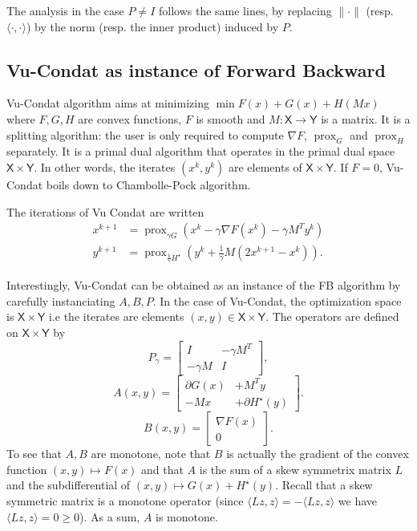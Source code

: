 \documentclass{article}
\DeclareMathOperator{\prox}{prox}
\newcommand{\sX}{{\mathsf X}}
\newcommand{\sY}{{\mathsf Y}}
\newcommand{\ps}[1]{\langle #1 \rangle}
\theoremstyle{definition}
\begin{document}
The analysis in the case $P \neq I$ follows the same lines, by replacing $\|\cdot\|$ (resp. $\ps{\cdot,\cdot}$) by the norm (resp. the inner product) induced by $P$. 




\subsection{Vu-Condat as instance of Forward Backward}

Vu-Condat algorithm aims at minimizing $\min F(x) + G(x) + H(Mx)$ where $F,G,H$ are convex functions, $F$ is smooth and $M : \sX \to \sY$ is a matrix. It is a splitting algorithm: the user is only required to compute $\nabla F$, $\prox_G$ and $\prox_H$ separately. It is a primal dual algorithm that operates in the primal dual space $\sX \times \sY$. In other words, the iterates $(x^k,y^k)$ are elements of $\sX \times \sY$. If $F=0$, Vu-Condat boils down to Chambolle-Pock algorithm.

The iterations of Vu Condat are written
\begin{align}
    x^{k+1}   &= \prox_{\gamma G}(x^k - \gamma \nabla F(x^k) - \gamma M^T y^k)\\
    y^{k+1} &= \prox_{\frac{1}{\gamma} H^\star}(y^k + \frac{1}{\gamma}M(2x^{k+1}-x^k)).
\end{align}

Interestingly, Vu-Condat can be obtained as an instance of the FB algorithm by carefully instanciating $A,B,P$. In the case of Vu-Condat, the optimization space is $\sX \times \sY$ i.e the iterates are elements $(x,y) \in \sX \times \sY$. The operators are defined on $\sX \times \sY$ by
\[
P_\gamma = \begin{bmatrix} I &  -\gamma M^T \\ -\gamma M & I \end{bmatrix},
\]
\[
A(x,y) = \begin{bmatrix} \partial G(x)&  + M^T y \\ -M x& +\partial H^\star(y)\end{bmatrix} .
\]
\[
B(x,y) = \begin{bmatrix} \nabla F(x) \\ 0 \end{bmatrix} .
\]
To see that $A,B$ are monotone, note that $B$ is actually the gradient of the convex function $(x,y) \mapsto F(x)$ and that $A$ is the sum of a skew symmetrix matrix $L$ and the subdifferential of $(x,y) \mapsto G(x) + H^\star(y)$. Recall that a skew symmetric matrix is a monotone operator (since $\ps{Lz,z} = -\ps{Lz,z}$ we have $\ps{Lz,z} = 0 \geq 0$). As a sum, $A$ is monotone.
\end{document}
